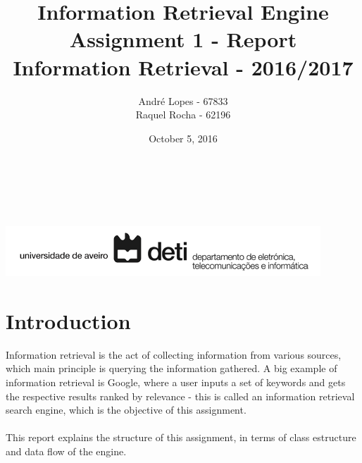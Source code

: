 \documentclass[11pt,a4paper]{report}
\title{\huge \textbf{Information Retrieval Engine}\\[0.2ex]
\large Assignment 1 - Report\\[1ex]
\large Information Retrieval - 2016/2017}
\author{\large Andr\'e Lopes - 67833\\[1ex]
        Raquel Rocha - 62196}
\date{\large October 5, 2016}
\begin{document}
\makeatletter
    \begin{titlepage}
        	\vspace*{\fill}
        \begin{center}
            {\@title }\\[2ex] 
            {\@author}\\[2ex] 
            {\@date}\\[5ex]
			\includegraphics[scale=0.8]{deti_logo.png}
        \end{center}
        
        	\vspace*{\fill}
    \end{titlepage}
\makeatother
\hypersetup{
    colorlinks,bookmarks=true,linktoc=all
}

\renewcommand*\contentsname{Table of Contents}
\renewcommand\lstlistlistingname{List of Code}
\tableofcontents
\vspace{2cm}
\begingroup
\let\clearpage\relax
\lstlistoflistings
\endgroup
\setcounter{secnumdepth}{2}
\chapter{Introduction}

Information retrieval is the act of collecting information from various sources, which main principle is querying the information gathered. A big example of information retrieval is Google, where a user inputs a set of keywords and gets the respective results ranked by relevance - this is called an information retrieval search engine, which is the objective of this assignment.\\\\
This report explains the structure of this assignment, in terms of class estructure and data flow of the engine. 
\end{document}
